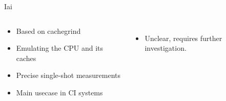 \documentclass[compress,aspectratio=169]{beamer}
\begin{document}
\begin{frame}{Iai \cite{iai}}
  \begin{columns}
    \begin{column}{0.5\textwidth}
  \begin{itemize}
    \item Based on cachegrind
    \item Emulating the CPU and its caches
    \item Precise single-shot measurements
    \item Main usecase in CI systems
  \end{itemize}
    \end{column}
    \pause
    \begin{column}{0.5\textwidth}
    \footnotesize\inputminted[xleftmargin=1em,linenos]{text}{../assets/iai.txt}
      \begin{itemize}
        \item Unclear, requires further investigation.
      \end{itemize}
    \end{column}
  \end{columns}
\end{frame}
\end{document}
